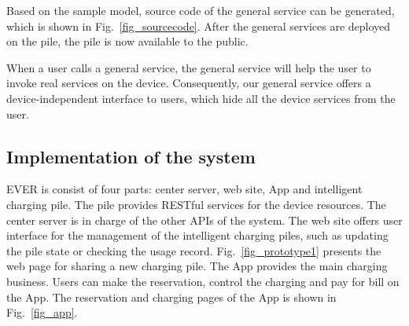 Based on the sample model, source code of the general service can be generated, which is shown in Fig.~\ref{fig_sourcecode}. After the general services are deployed on the pile, the pile is now available to the public. 

When a user calls a general service, the general service will help the user to invoke real services on the device. Consequently, our general service offers a device-independent interface to users, which hide all the device services from the user. 

\subsection{Implementation of the system}
EVER is consist of four parts: center server, web site, App and intelligent charging pile. The pile provides RESTful services for the device resources. The center server is in charge of the other APIs of the system. The web site offers user interface for the management of the intelligent charging piles, such as updating the pile state or checking the usage record. Fig.~\ref{fig_prototype1} presents the web page for sharing a new charging pile. The App provides the main charging business. Users can make the reservation, control the charging and pay for bill on the App. The reservation and charging pages of the App is shown in Fig.~\ref{fig_app}. 



